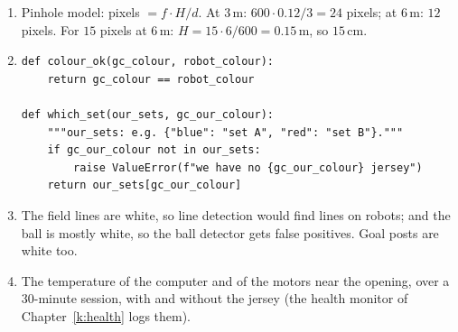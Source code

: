 \begin{enumerate}[label=\textbf{\ansnum.\arabic*}]
  \item Pinhole model: pixels $=f\cdot H/d$. At $3$\,m: $600\cdot0.12/3=24$ pixels; at $6$\,m: $12$ pixels. For $15$ pixels at $6$\,m: $H=15\cdot6/600=0.15$\,m, so $15$\,cm.
  \item
\begin{verbatim}
def colour_ok(gc_colour, robot_colour):
    return gc_colour == robot_colour

def which_set(our_sets, gc_our_colour):
    """our_sets: e.g. {"blue": "set A", "red": "set B"}."""
    if gc_our_colour not in our_sets:
        raise ValueError(f"we have no {gc_our_colour} jersey")
    return our_sets[gc_our_colour]
\end{verbatim}
  \item The field lines are white, so line detection would find lines on robots; and the ball is mostly white, so the ball detector gets false positives. Goal posts are white too.
  \item The temperature of the computer and of the motors near the opening, over a $30$-minute session, with and without the jersey (the health monitor of Chapter~\ref{k:health} logs them).
\end{enumerate}
